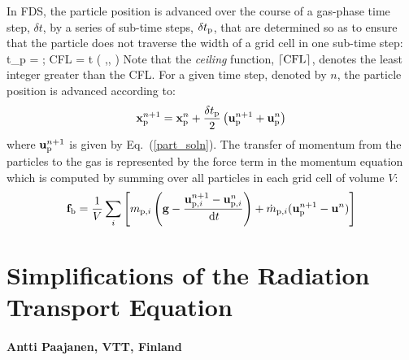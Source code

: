 In FDS, the particle position is advanced over the course of a gas-phase time step, $\delta t$, by a series of sub-time steps, $\delta t_{\rm p}$, that are determined so as to ensure that the particle does not traverse the width of a grid cell in one sub-time step:
\be
   \delta t_{\rm p} =  \quad ; \quad \hbox{CFL} = \delta t \max \left( ,, \right)
\ee
Note that the {\em ceiling} function, $\lceil \hbox{CFL} \rceil$, denotes the least integer greater than the CFL. For a given time step, denoted by $n$, the particle position is advanced according to:
\begin{equation}
    \mathbf{x}_{\rm p}^{n+1} = \mathbf{x}_{\rm p}^n + \frac{\delta t_{\rm p}}{2} \left( \mathbf{u}_{\rm p}^{n+1} + \mathbf{u}_{\rm p}^n \right)
\end{equation}
where $\mathbf{u}_{\rm p}^{n+1}$ is given by Eq.~(\ref{part_soln}). The transfer of momentum from the particles to the gas is represented by the force term in the momentum equation which is computed by summing over all particles in each grid cell of volume $V$:
\begin{equation}
   \mathbf{f}_{\rm b} = \frac{1}{V} \sum_i \left[ m_{{\rm p},i} \left( {\mathbf{g}} - \frac{{\mathbf{u}}_{{\rm p},i}^{n+1}-{\mathbf{u}}_{{\rm p},i}^n}{\,\mathrm{d} t} \right) + \dot{m}_{{\rm p},i}  (\mathbf{u}_{\rm p}^{n+1} - \mathbf{u}^n) \right]
\end{equation}







\chapter{Simplifications of the Radiation Transport Equation}
\label{radiation_derivations}

\subsubsection*{Antti Paajanen, VTT, Finland}



